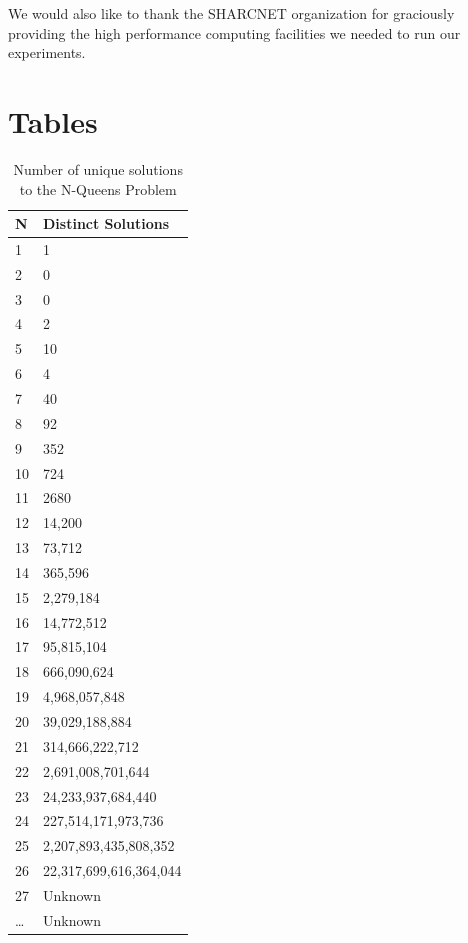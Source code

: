 \documentclass{sig-alternate}
\begin{document}
We would also like to thank the SHARCNET organization for graciously providing the high performance computing facilities we needed to run our experiments.



%
%


\appendix
\section{Tables}
\begin{table}[!h]
\centering
\caption{Number of unique solutions to the N-Queens Problem}
\begin{tabular}{|l|l|} \hline
N & Distinct Solutions      \\ \hline
1  & 1                      \\
2  & 0                      \\
3  & 0                      \\
4  & 2                      \\
5  & 10                     \\
6  & 4                      \\
7  & 40                     \\
8  & 92                     \\
9  & 352                    \\
10 & 724                    \\
11 & 2680                   \\
12 & 14,200                 \\
13 & 73,712                 \\
14 & 365,596                \\
15 & 2,279,184              \\
16 & 14,772,512             \\
17 & 95,815,104             \\
18 & 666,090,624            \\
19 & 4,968,057,848          \\
20 & 39,029,188,884         \\
21 & 314,666,222,712        \\
22 & 2,691,008,701,644      \\
23 & 24,233,937,684,440     \\
24 & 227,514,171,973,736    \\
25 & 2,207,893,435,808,352  \\
26 & 22,317,699,616,364,044 \\
27 & Unknown				\\
\dots & Unknown				\\
\hline\end{tabular}
\label{table:numuniquesol}
\end{table}
\end{document}
